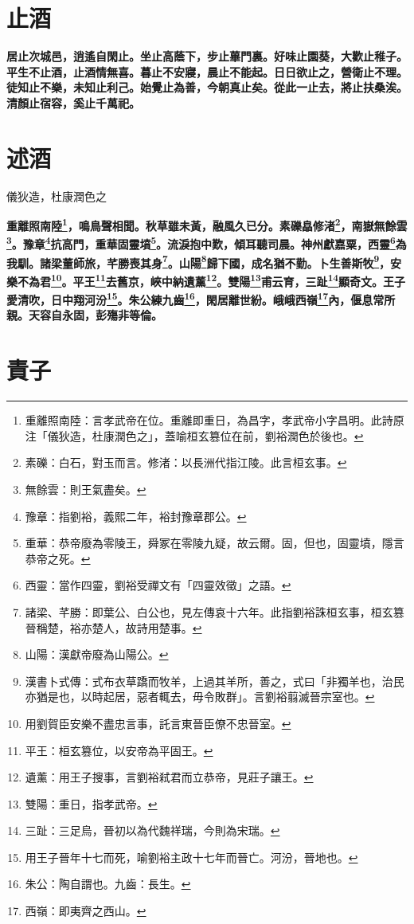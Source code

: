 \section{止酒}

\textbf{居止次城邑，逍遙自閑止。坐止高蔭下，步止蓽門裏。好味止園葵，大歡止稚子。平生不止酒，止酒情無喜。暮止不安寢，晨止不能起。日日欲止之，營衛止不理。徒知止不樂，未知止利己。始覺止為善，今朝真止矣。從此一止去，將止扶桑涘。清顏止宿容，奚止千萬祀。}

\section{述酒\hspace{1ex}{\footnotesize }}

\begin{quoting}儀狄造，杜康潤色之\end{quoting}

\textbf{重離照南陸\footnote{重離照南陸：言孝武帝在位。重離即重日，為昌字，孝武帝小字昌明。此詩原注「儀狄造，杜康潤色之」，蓋喻桓玄篡位在前，劉裕潤色於後也。}，鳴鳥聲相聞。秋草雖未黃，融風久已分。素礫皛修渚\footnote{素礫：白石，對玉而言。修渚：以長洲代指江陵。此言桓玄事。}，南嶽無餘雲\footnote{無餘雲：則王氣盡矣。}。豫章\footnote{豫章：指劉裕，義熙二年，裕封豫章郡公。}抗高門，重華固靈墳\footnote{重華：恭帝廢為零陵王，舜冢在零陵九疑，故云爾。固，但也，固靈墳，隱言恭帝之死。}。流淚抱中歎，傾耳聽司晨。神州獻嘉粟，西靈\footnote{西靈：當作四靈，劉裕受禪文有「四靈效徵」之語。}為我馴。諸梁董師旅，芊勝喪其身\footnote{諸梁、芊勝：即葉公、白公也，見左傳哀十六年。此指劉裕誅桓玄事，桓玄篡晉稱楚，裕亦楚人，故詩用楚事。}。山陽\footnote{山陽：漢獻帝廢為山陽公。}歸下國，成名猶不勤。卜生善斯牧\footnote{漢書卜式傳：式布衣草蹻而牧羊，上過其羊所，善之，式曰「非獨羊也，治民亦猶是也，以時起居，惡者輒去，毋令敗群」。言劉裕翦滅晉宗室也。}，安樂不為君\footnote{用劉賀臣安樂不盡忠言事，託言東晉臣僚不忠晉室。}。平王\footnote{平王：桓玄篡位，以安帝為平固王。}去舊京，峽中納遺薰\footnote{遺薰：用王子搜事，言劉裕弒君而立恭帝，見莊子讓王。}。雙陽\footnote{雙陽：重日，指孝武帝。}甫云育，三趾\footnote{三趾：三足烏，晉初以為代魏祥瑞，今則為宋瑞。}顯奇文。王子愛清吹，日中翔河汾\footnote{用王子晉年十七而死，喻劉裕主政十七年而晉亡。河汾，晉地也。}。朱公練九齒\footnote{朱公：陶自謂也。九齒：長生。}，閑居離世紛。峨峨西嶺\footnote{西嶺：即夷齊之西山。}內，偃息常所親。天容自永固，彭殤非等倫。}

\section{責子}

